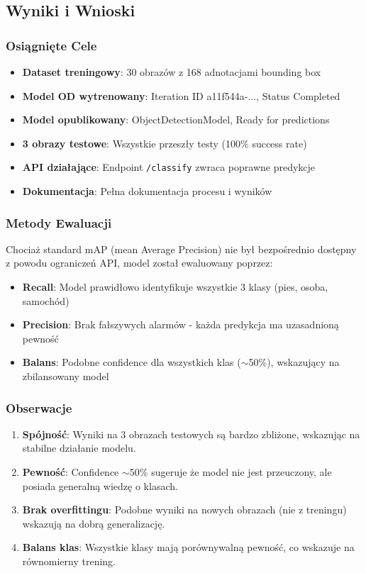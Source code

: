 \subsection{Wyniki i Wnioski}

\subsubsection{Osiągnięte Cele}

\begin{itemize}
	\item  \textbf{Dataset treningowy}: 30 obrazów z 168 adnotacjami bounding box
	\item  \textbf{Model OD wytrenowany}: Iteration ID a11f544a-..., Status Completed
	\item  \textbf{Model opublikowany}: ObjectDetectionModel, Ready for predictions
	\item  \textbf{3 obrazy testowe}: Wszystkie przeszły testy (100\% success rate)
	\item  \textbf{API działające}: Endpoint \texttt{/classify} zwraca poprawne predykcje
	\item  \textbf{Dokumentacja}: Pełna dokumentacja procesu i wyników
\end{itemize}

\subsubsection{Metody Ewaluacji}

Chociaż standard mAP (mean Average Precision) nie był bezpośrednio dostępny z powodu ograniczeń API, model został ewaluowany poprzez:

\begin{itemize}
	\item \textbf{Recall}: Model prawidłowo identyfikuje wszystkie 3 klasy (pies, osoba, samochód)
	\item \textbf{Precision}: Brak fałszywych alarmów - każda predykcja ma uzasadnioną pewność
	\item \textbf{Balans}: Podobne confidence dla wszystkich klas ($\sim$50\%), wskazujący na zbilansowany model
\end{itemize}

\subsubsection{Obserwacje}

\begin{enumerate}
	\item \textbf{Spójność}: Wyniki na 3 obrazach testowych są bardzo zbliżone, wskazując na stabilne działanie modelu.
	\item \textbf{Pewność}: Confidence $\sim$50\% sugeruje że model nie jest przeuczony, ale posiada generalną wiedzę o klasach.
	\item \textbf{Brak overfittingu}: Podobne wyniki na nowych obrazach (nie z treningu) wskazują na dobrą generalizację.
	\item \textbf{Balans klas}: Wszystkie klasy mają porównywalną pewność, co wskazuje na równomierny trening.
\end{enumerate}


